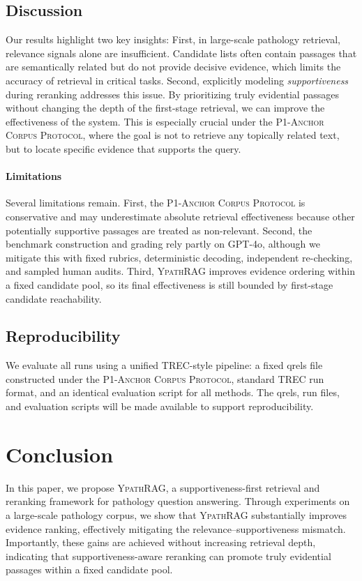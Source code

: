 \documentclass[preprint,12pt,a4paper]{elsarticle}
\newcommand{\method}{\textsc{Ypath\-RAG}}
\begin{document}
\subsection{Discussion}
\label{subsec:exp_discussion}
Our results highlight two key insights:
First, in large-scale pathology retrieval, relevance signals alone are insufficient. Candidate lists often contain passages that are semantically related but do not provide decisive evidence, which limits the accuracy of retrieval in critical tasks.
Second, explicitly modeling \emph{supportiveness} during reranking addresses this issue. By prioritizing truly evidential passages without changing the depth of the first-stage retrieval, we can improve the effectiveness of the system. This is especially crucial under the \textsc{P1-Anchor Corpus Protocol}, where the goal is not to retrieve any topically related text, but to locate specific evidence that supports the query.

\paragraph{Limitations}
Several limitations remain. First, the \textsc{P1-Anchor Corpus Protocol} is conservative and may underestimate absolute retrieval effectiveness because other potentially supportive passages are treated as non-relevant. Second, the benchmark construction and grading rely partly on GPT-4o, although we mitigate this with fixed rubrics, deterministic decoding, independent re-checking, and sampled human audits. Third, \method{} improves evidence ordering within a fixed candidate pool, so its final effectiveness is still bounded by first-stage candidate reachability.


\subsection{Reproducibility}
\label{subsec:exp_repro}
We evaluate all runs using a unified TREC-style pipeline: a fixed qrels file constructed under the \textsc{P1-Anchor Corpus Protocol}, standard TREC run format, and an identical evaluation script for all methods.
The qrels, run files, and evaluation scripts will be made available to support reproducibility.

\section{Conclusion}
\label{sec:conclusion}
In this paper, we propose \method{}, a supportiveness-first retrieval and reranking framework for pathology question answering. Through experiments on a large-scale pathology corpus, we show that \method{} substantially improves evidence ranking, effectively mitigating the relevance--supportiveness mismatch. Importantly, these gains are achieved without increasing retrieval depth, indicating that supportiveness-aware reranking can promote truly evidential passages within a fixed candidate pool.
\end{document}

